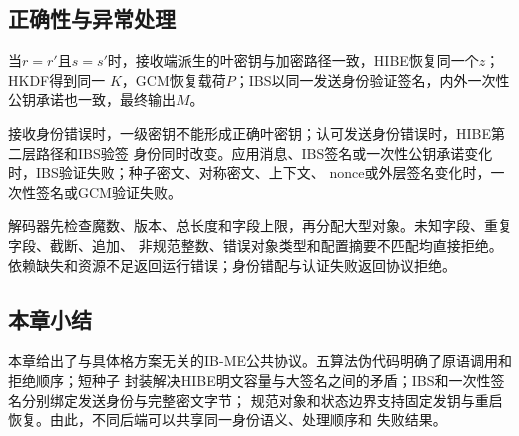 \subsection{正确性与异常处理}

当$r=r'$且$s=s'$时，接收端派生的叶密钥与加密路径一致，HIBE恢复同一个$z$；HKDF得到同一
$K$，GCM恢复载荷$P$；IBS以同一发送身份验证签名，内外一次性公钥承诺也一致，最终输出$M$。

接收身份错误时，一级密钥不能形成正确叶密钥；认可发送身份错误时，HIBE第二层路径和IBS验签
身份同时改变。应用消息、IBS签名或一次性公钥承诺变化时，IBS验证失败；种子密文、对称密文、上下文、
nonce或外层签名变化时，一次性签名或GCM验证失败。

解码器先检查魔数、版本、总长度和字段上限，再分配大型对象。未知字段、重复字段、截断、追加、
非规范整数、错误对象类型和配置摘要不匹配均直接拒绝。依赖缺失和资源不足返回运行错误；身份错配与认证失败返回协议拒绝。

\subsection{本章小结}

本章给出了与具体格方案无关的IB-ME公共协议。五算法伪代码明确了原语调用和拒绝顺序；短种子
封装解决HIBE明文容量与大签名之间的矛盾；IBS和一次性签名分别绑定发送身份与完整密文字节；
规范对象和状态边界支持固定发钥与重启恢复。由此，不同后端可以共享同一身份语义、处理顺序和
失败结果。
